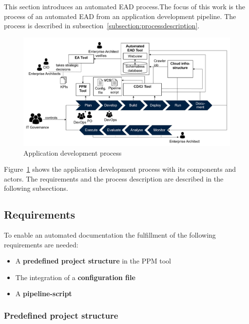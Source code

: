 This section introduces an automated EAD process.The focus of this work is the process of an automated EAD from an application development pipeline. The process is described in subsection~\ref{subsection:processdescription}.

\begin{figure}[htpb]
  \centering
  \includegraphics[width=1.0\textwidth]{figures/application-development-process.PNG}
  \caption{Application development process}
  \label{fig:application-development-process}
\end{figure}

Figure~\ref{fig:application-development-process} shows the application development process with its components and actors. The requirements and the process description are described in the following subsections.

\subsection{Requirements}\label{subsection:requirements}

To enable an automated documentation the fulfillment of the following requirements are needed:

\begin{itemize}
    \item A \textbf{predefined project structure} in the PPM tool
    \item The integration of a \textbf{configuration file}
    \item A \textbf{pipeline-script}
\end{itemize}
\subsubsection{Predefined project structure}

